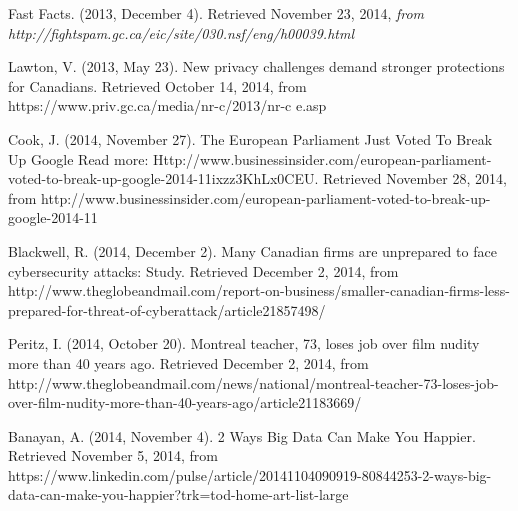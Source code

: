 \documentclass[12pt]{article}
\begin{document}
\begin{thebibliography}{99}
	Fast Facts. (2013, December 4). Retrieved November 23, 2014, {\sl from http://fightspam.gc.ca/eic/site/030.nsf/eng/h\textunderscore00039.html}

	Lawton, V. (2013, May 23). New privacy challenges demand stronger protections for Canadians. Retrieved October 14, 2014, from https://www.priv.gc.ca/media/nr-c/2013/nr-c \textunderscore e.asp

	Cook, J. (2014, November 27). The European Parliament Just Voted To Break Up Google Read more: Http://www.businessinsider.com/european-parliament-voted-to-break-up-google-2014-11ixzz3KhLx0CEU. Retrieved November 28, 2014, from http://www.businessinsider.com/european-parliament-voted-to-break-up-google-2014-11

	Blackwell, R. (2014, December 2). Many Canadian firms are unprepared to face cybersecurity attacks: Study. Retrieved December 2, 2014, from http://www.theglobeandmail.com/report-on-business/smaller-canadian-firms-less-prepared-for-threat-of-cyberattack/article21857498/

	Peritz, I. (2014, October 20). Montreal teacher, 73, loses job over film nudity more than 40 years ago. Retrieved December 2, 2014, from http://www.theglobeandmail.com/news/national/montreal-teacher-73-loses-job-over-film-nudity-more-than-40-years-ago/article21183669/

	Banayan, A. (2014, November 4). 2 Ways Big Data Can Make You Happier. Retrieved November 5, 2014, from https://www.linkedin.com/pulse/article/20141104090919-80844253-2-ways-big-data-can-make-you-happier?trk=tod-home-art-list-large
\end{thebibliography}
\end{document}
